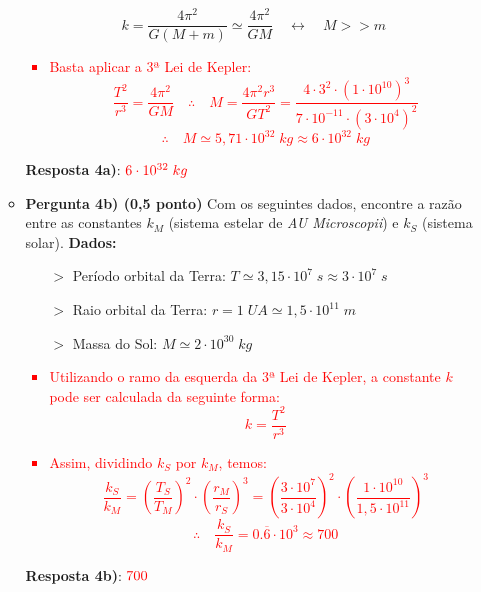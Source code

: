 \documentclass[a4paper, 12pt]{article}
\newcommand{\red}[1]
{
	\textcolor{red}{#1}
}
\begin{document}
\begin{flushleft}
\begin{itemize}
\begin{itemize}
						$$k = \frac{4 \pi^2}{G(M+m)} \simeq \frac{4 \pi^2}{GM} \quad \leftrightarrow \quad M>>m$$
					\red{\begin{itemize}
						\item Basta aplicar a 3ª Lei de Kepler:
							$$\frac{T^2}{r^3} = \frac{4 \pi^2}{GM} \quad \therefore \quad M = \frac{4 \pi^2 r^3}{G T^2} = \frac{4 \cdot 3^2 \cdot (1 \cdot 10^{10})^3}{7 \cdot 10^{-11} \cdot (3 \cdot 10^4)^2}$$
							$$\therefore \quad M \simeq 5,71 \cdot 10^{32} \; kg \approx 6 \cdot 10^{32} \; kg$$
					\end{itemize}}
					\textbf{Resposta 4a)}: $\red{6 \cdot 10^{32} \; kg}$
				\item \textbf{Pergunta 4b) (0,5 ponto)} Com os seguintes dados, encontre a razão entre as constantes $k_M$ (sistema estelar de \textit{AU Microscopii}) e $k_S$ (sistema solar). \linebreak
					\textbf{Dados:}
						\begin{itemize}
							\item[$>$] Período orbital da Terra: $T \simeq 3,15 \cdot 10^7 \; s \approx 3 \cdot 10^7 \; s$
							\item[$>$] Raio orbital da Terra: $r = 1 \; UA \simeq 1,5 \cdot 10^11 \; m$
							\item[$>$] Massa do Sol: $M \simeq 2 \cdot 10^{30} \; kg$
						\end{itemize}
					\red{\begin{itemize}
						\item Utilizando o ramo da esquerda da 3ª Lei de Kepler, a constante $k$ pode ser calculada da seguinte forma:
							$$k = \frac{T^2}{r^3}$$
						\item Assim, dividindo $k_S$ por $k_M$, temos:
							$$\frac{k_S}{k_M} = \left( \frac{T_S}{T_M} \right)^2 \cdot \left( \frac{r_M}{r_S} \right)^3 = \left( \frac{3 \cdot 10^7}{3 \cdot 10^4} \right)^2 \cdot \left( \frac{1 \cdot 10^{10}}{1,5 \cdot 10^{11}} \right)^3$$
							$$\therefore \quad \frac{k_S}{k_M} = 0.\overline{6} \cdot 10^3 \approx 700$$
					\end{itemize}}
					\textbf{Resposta 4b)}: $\red{700}$
			\end{itemize}
		

\end{itemize}
\end{flushleft}
\end{document}
